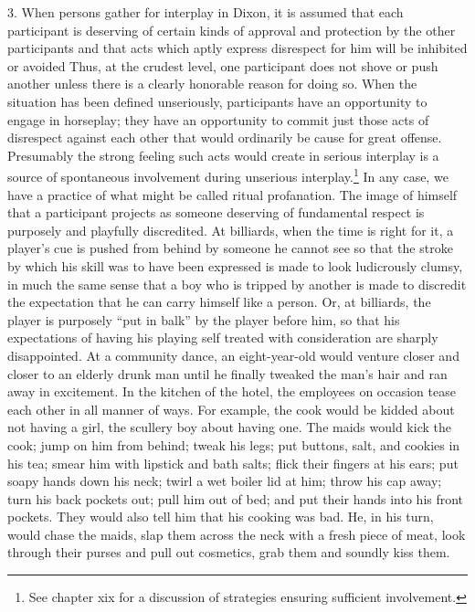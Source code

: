 \documentclass[openany,nobib]{tufte-book}
\begin{document}
3. When persons gather for interplay in Dixon, it is assumed that each
participant is deserving of certain kinds of approval and protection by
the other participants and that acts which aptly express disrespect for
him will be inhibited or avoided Thus, at the crudest level, one
participant does not shove or push another unless there is a clearly
honorable reason for doing so. When the situation has been defined
unseriously, participants have an opportunity to engage in horseplay;
they have an opportunity to commit just those acts of disrespect against
each other that would ordinarily be cause for great offense. Presumably
the strong feeling such acts would create in serious interplay is a
source of spontaneous involvement during unserious interplay.\footnote{See
  chapter xix for a discussion of strategies ensuring sufficient
  involvement.} In any case, we have a practice of what might be called
ritual profanation. The image of himself that a participant projects as
someone deserving of fundamental respect is purposely and playfully
discredited. At billiards, when the time is right for it, a player's cue
is pushed from behind by someone he cannot see so that the stroke by
which his skill was to have been expressed is made to look ludicrously
clumsy, in much the same sense that a boy who is tripped by another is
made to discredit the expectation that he can carry himself like a
person. Or, at billiards, the player is purposely ``put in balk'' by the
player before him, so that his expectations of having his playing self
treated with consideration are sharply disappointed. At a community
dance, an eight-year-old would venture closer and closer to an elderly
drunk man until he finally tweaked the man's hair and ran away in
excitement. In the kitchen of the hotel, the employees on occasion tease
each other in all manner of ways. For example, the cook would be kidded
about not having a girl, the scullery boy about having one. The maids
would kick the cook; jump on him from behind; tweak his legs; put
buttons, salt, and cookies in his tea; smear him with lipstick and bath
salts; flick their fingers at his ears; put soapy hands down his neck;
twirl a wet boiler lid at him; throw his cap away; turn his back pockets
out; pull him out of bed; and put their hands into his front pockets.
They would also tell him that his cooking was bad. He, in his turn,
would chase the maids, slap them across the neck with a fresh piece of
meat, look through their purses and pull out cosmetics, grab them and
soundly kiss them.
\end{document}
